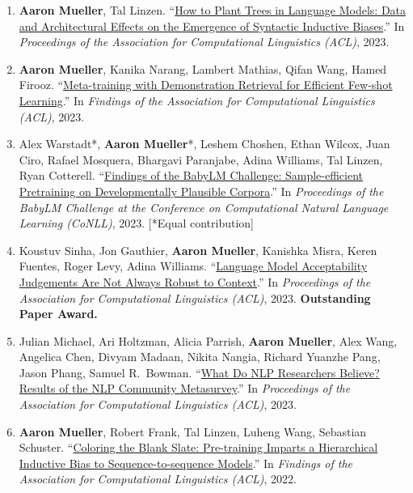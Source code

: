 \documentclass[10pt]{article}
\providecommand*\titlelink[2]{\href{#1}{\textcolor{accent}{#2}}}
\begin{document}
\begin{enumerate}[leftmargin=*, topsep=0pt, itemsep=0.25ex, partopsep=0ex, parsep=1ex, label=C\arabic*., ref=C\arabic*]
	\item \textbf{Aaron Mueller}, Tal Linzen. ``\titlelink{https://arxiv.org/abs/2305.19905}{How to Plant Trees in Language Models: Data and Architectural Effects on the Emergence of Syntactic Inductive Biases}.'' In \emph{Proceedings of the Association for Computational Linguistics (ACL)}, 2023.
		
	\item \textbf{Aaron Mueller}, Kanika Narang, Lambert Mathias, Qifan Wang, Hamed Firooz. ``\titlelink{https://arxiv.org/abs/2307.00119}{Meta-training with Demonstration Retrieval for Efficient Few-shot Learning}.'' In \textit{Findings of the Association for Computational Linguistics (ACL)}, 2023.\label{pub:metalearn}
	
	\item Alex Warstadt*, \textbf{Aaron Mueller}*, Leshem Choshen, Ethan Wilcox, Juan Ciro, Rafael Mosquera, Bhargavi Paranjabe, Adina Williams, Tal Linzen, Ryan Cotterell. ``\titlelink{https://arxiv.org/abs/2301.11796}{Findings of the BabyLM Challenge: Sample-efficient Pretraining on Developmentally Plausible Corpora}.'' In \emph{Proceedings of the BabyLM Challenge at the Conference on Computational Natural Language Learning (CoNLL)}, 2023. [*Equal contribution]
	
	\item Koustuv Sinha, Jon Gauthier, \textbf{Aaron Mueller}, Kanishka Misra, Keren Fuentes, Roger Levy, Adina Williams. ``\titlelink{https://arxiv.org/abs/2212.08979}{Language Model Acceptability Judgements Are Not Always Robust to Context}.'' In \emph{Proceedings of the Association for Computational Linguistics (ACL)}, 2023. \textbf{\textcolor{accent}{Outstanding Paper Award.}}
	
	\item Julian Michael, Ari Holtzman, Alicia Parrish, \textbf{Aaron Mueller}, Alex Wang, Angelica Chen, Divyam Madaan, Nikita Nangia, Richard Yuanzhe Pang, Jason Phang, Samuel R.\ Bowman. ``\titlelink{https://arxiv.org/abs/2208.12852}{What Do NLP Researchers Believe? Results of the NLP Community Metasurvey}.'' In \emph{Proceedings of the Association for Computational Linguistics (ACL)}, 2023.
	
	\item \textbf{Aaron Mueller}, Robert Frank, Tal Linzen, Luheng Wang, Sebastian Schuster. ``\titlelink{https://aclanthology.org/2022.findings-acl.106.pdf}{Coloring the Blank Slate: Pre-training Imparts a Hierarchical Inductive Bias to Sequence-to-sequence Models}.'' In \emph{Findings of the Association for Computational Linguistics (ACL)}, 2022.


\end{enumerate}
\end{document}
